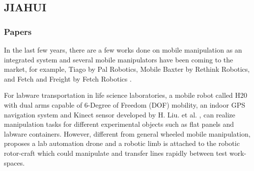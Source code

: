 \documentclass[12pt,draftclsnofoot,onecolumn]{IEEEtran}
\begin{document}
	
	
	
	\subsection{JIAHUI}
	\subsubsection{Papers}
	In the last few years, there are a few works done on mobile manipulation as an integrated system and several mobile manipulators have been coming to the market, for example, Tiago by Pal Robotics, Mobile Baxter by Rethink Robotics, and Fetch and Freight by Fetch Robotics \cite{roa2015mobile}. 
	
	
	
	For labware transportation in life science laboratories, a mobile robot called H20 with dual arms capable of 6-Degree of Freedom (DOF) mobility, an indoor GPS navigation system and Kinect sensor developed by H. Liu. et al. \cite{liu2013mobile},\cite{ali2016kinematic} can realize manipulation tasks for different experimental objects such as flat panels and labware containers. However, different from general wheeled mobile manipulation, \cite{kim2018lab} proposes a lab automation drone and a robotic limb is attached to the robotic rotor-craft which could manipulate and transfer lines rapidly between test work-spaces. 
	
\end{document}
